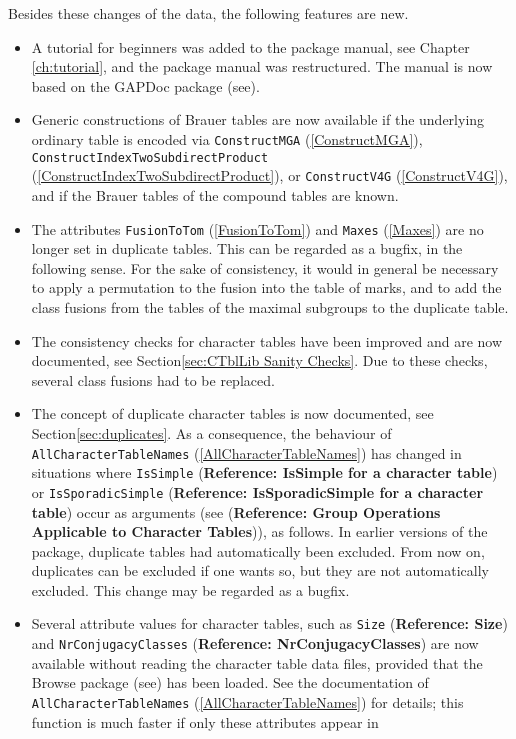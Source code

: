 \documentclass[a4paper,11pt]{report}
\begin{document}
{{{ Besides these changes of the data, the following features are new. 
\begin{itemize}
\item  A tutorial for beginners was added to the package manual, see Chapter \ref{ch:tutorial}, and the package manual was restructured. The manual is now based on the \textsf{GAPDoc} package (see{\nobreakspace}\cite{GAPDoc}). 
\item  Generic constructions of Brauer tables are now available if the underlying
ordinary table is encoded via \texttt{ConstructMGA} (\ref{ConstructMGA}), \texttt{ConstructIndexTwoSubdirectProduct} (\ref{ConstructIndexTwoSubdirectProduct}), or \texttt{ConstructV4G} (\ref{ConstructV4G}), and if the Brauer tables of the compound tables are known. 
\item  The attributes \texttt{FusionToTom} (\ref{FusionToTom}) and \texttt{Maxes} (\ref{Maxes}) are no longer set in duplicate tables. This can be regarded as a bugfix, in
the following sense. For the sake of consistency, it would in general be
necessary to apply a permutation to the fusion into the table of marks, and to
add the class fusions from the tables of the maximal subgroups to the
duplicate table. 
\item  The consistency checks for character tables have been improved and are now
documented, see Section{\nobreakspace}\ref{sec:CTblLib Sanity Checks}. Due to these checks, several class fusions had to be replaced. 
\item  The concept of duplicate character tables is now documented, see
Section{\nobreakspace}\ref{sec:duplicates}. As a consequence, the behaviour of \texttt{AllCharacterTableNames} (\ref{AllCharacterTableNames}) has changed in situations where \texttt{IsSimple} (\textbf{Reference: IsSimple for a character table}) or \texttt{IsSporadicSimple} (\textbf{Reference: IsSporadicSimple for a character table}) occur as arguments (see  (\textbf{Reference: Group Operations Applicable to Character Tables})), as follows. In earlier versions of the package, duplicate tables had
automatically been excluded. From now on, duplicates can be excluded if one
wants so, but they are not automatically excluded. This change may be regarded
as a bugfix. 
\item  Several attribute values for character tables, such as \texttt{Size} (\textbf{Reference: Size}) and \texttt{NrConjugacyClasses} (\textbf{Reference: NrConjugacyClasses}) are now available without reading the character table data files, provided
that the \textsf{Browse} package (see{\nobreakspace}\cite{Browse}) has been loaded. See the documentation of \texttt{AllCharacterTableNames} (\ref{AllCharacterTableNames}) for details; this function is much faster if only these attributes appear in

\end{itemize}}}}
\end{document}
